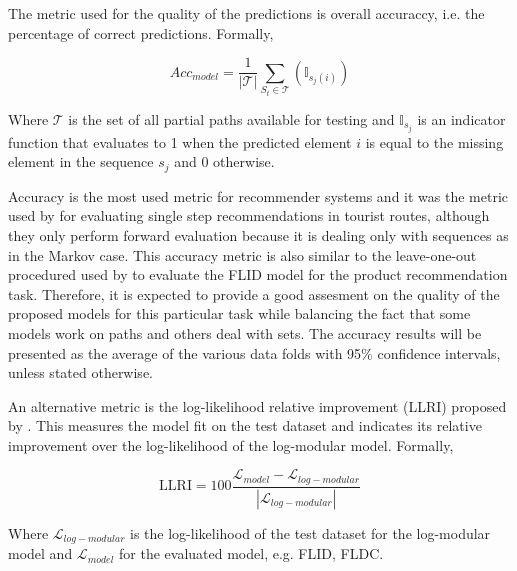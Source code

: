 The metric used for the quality of the predictions is overall accuraccy, i.e. the percentage of correct predictions. Formally, 

\begin{equation}
  Acc_{model} = \frac{1}{|\mathcal{T}|}\sum_{S_{t} \in \mathcal{T}}(\mathbb{I}_{s_{j}(i)})
\end{equation}

Where $\mathcal{T}$ is the set of all partial paths available for testing and $\mathbb{I}_{s_{j}}$ is an indicator function that evaluates to 1 when the predicted element $i$ is equal to the missing element in the sequence $s_{j}$ and 0 otherwise.

Accuracy is the most used metric for recommender systems \citep{Herlocker2004} and it was the metric used by \citet{Kurashima2010} for evaluating single step recommendations in tourist routes, although they only perform forward evaluation because it is dealing only with sequences as in the Markov case. This accuracy metric is also similar to the leave-one-out procedured used by \citet{tschiatschek16learning} to evaluate the FLID model for the product recommendation task. Therefore, it is expected to provide a good assesment on the quality of the proposed models for this particular task while balancing the fact that some models work on paths and others deal with sets. The accuracy results will be presented as the average of the various data folds with 95\% confidence intervals, unless stated otherwise.

An alternative metric is the log-likelihood relative improvement (LLRI) proposed by \citet{tschiatschek16learning}. This measures the model fit on the test dataset and indicates its relative improvement over the log-likelihood of the log-modular model. Formally,

\begin{equation}
  \mathrm{LLRI} = 100\frac{\mathcal{L}_{model} - \mathcal{L}_{log-modular}}{|\mathcal{L}_{log-modular}|}
\end{equation}

Where $\mathcal{L}_{log-modular}$ is the log-likelihood of the test dataset for the log-modular model and  $\mathcal{L}_{model}$ for the evaluated model, e.g. FLID, FLDC.